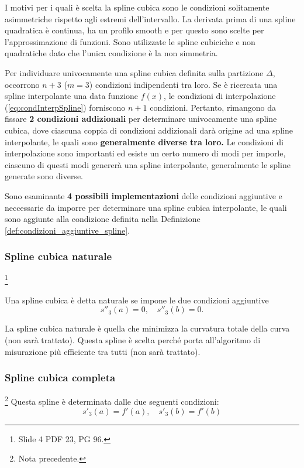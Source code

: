 I motivi per i quali è scelta la spline cubica sono le condizioni solitamente asimmetriche rispetto agli estremi dell'intervallo. La derivata prima di una spline quadratica è continua, ha un profilo smooth e per questo sono scelte per l'approssimazione di funzioni. Sono utilizzate le spline cubiciche e non quadratiche dato che l'unica condizione è la non simmetria.

Per individuare univocamente una spline cubica definita sulla partizione $\Delta$, occorrono $n+3$ ($m=3$) condizioni indipendenti tra loro. Se è ricercata una spline interpolante una data funzione $f(x)$, le condizioni di interpolazione (\ref{eq:condInterpSpline}) forniscono $n+1$ condizioni. Pertanto, rimangono da fissare \textbf{2 condizioni addizionali} per determinare univocamente una spline cubica, dove ciascuna coppia di condizioni addizionali darà origine ad una spline interpolante, le quali sono \textbf{generalmente diverse tra loro.} Le condizioni di interpolazione sono importanti ed esiste un certo numero di modi per imporle, ciascuno di questi modi genererà una spline interpolante, generalmente le spline generate sono diverse.

Sono esaminante \textbf{4 possibili implementazioni} delle condizioni aggiuntive e neccessarie da imporre per determinare una spline cubica interpolante, le quali sono aggiunte alla condizione definita nella Definizione \ref{def:condizioni_aggiuntive_spline}.
\subsubsection{Spline cubica naturale}
\footnote{Slide 4 PDF 23, PG 96.} 
\begin{definition}
	Una spline cubica è detta naturale se impone le due condizioni aggiuntive
	\begin{equation}\label{eq:condSplineCubNat}
    \boxed{s''_3(a)=0,\quad s''_3(b)=0.}
\end{equation}

\end{definition}
La spline cubica naturale è quella che minimizza la curvatura totale della curva (non sarà trattato). Questa spline è scelta perché porta all'algoritmo di misurazione più efficiente tra tutti (non sarà trattato).

\subsubsection{Spline cubica completa}\footnote{Nota precedente.}
Questa spline è determinata dalle due seguenti condizioni:
\begin{equation}\label{eq:condSplineCubComp}
    \boxed{s'_3(a)=f'(a),\quad s'_3(b)=f'(b)}
\end{equation}

